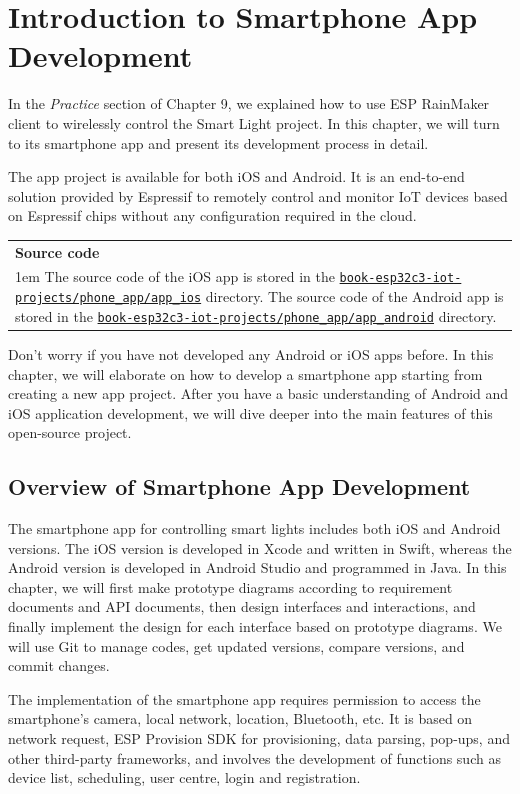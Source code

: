 \documentclass[a4paper,12pt,openany]{book}
\newcommand{\note}[2][NOTE]{ %
\vspace{6pt}
\begin{tabular}{b{\textwidth}}
\hline
\fontfamily{phv}\selectfont \textbf{#1}\\
\leftskip 1em #2\\
\hline
\end{tabular}
}
\begin{document}
\section{Introduction to Smartphone App Development}
In the \textit{Practice} section of Chapter 9, we explained how to use ESP RainMaker client to wirelessly control the Smart Light project. In this chapter, we will turn to its smartphone app and present its development process in detail.

The app project is available for both iOS and Android. It is an end-to-end solution provided by Espressif to remotely control and monitor IoT devices based on Espressif chips without any configuration required in the cloud.

\note[Source code]{The source code of the iOS app is stored in the \href{https://github.com/espressif/book-esp32c3-iot-projects/tree/main/phone_app/app_ios}{\texttt{book-esp32c3-iot-projects/\newline phone\_app/app\_ios}} directory. The source code of the Android app is stored in the \href{https://github.com/espressif/book-esp32c3-iot-projects/tree/main/phone_app/app_android}{\texttt{book-esp32c3-iot-projects/phone\_app/app\_android}} directory.}

Don’t worry if you have not developed any Android or iOS apps before. In this chapter, we will elaborate on how to develop a smartphone app starting from creating a new app project. After you have a basic understanding of Android and iOS application development, we will dive deeper into the main features of this open-source project.

\subsection{Overview of Smartphone App Development}
The smartphone app for controlling smart lights includes both iOS and Android versions. The iOS version is developed in Xcode and written in Swift, whereas the Android version is developed in Android Studio and programmed in Java. In this chapter, we will first make prototype diagrams according to requirement documents and API documents, then design interfaces and interactions, and finally implement the design for each interface based on prototype diagrams. We will use Git to manage codes, get updated versions, compare versions, and commit changes.

The implementation of the smartphone app requires permission to access the smartphone’s camera, local network, location, Bluetooth, etc. It is based on network request, ESP Provision SDK for provisioning, data parsing, pop-ups, and other third-party frameworks, and involves the development of functions such as device list, scheduling, user centre, login and registration.
\end{document}
